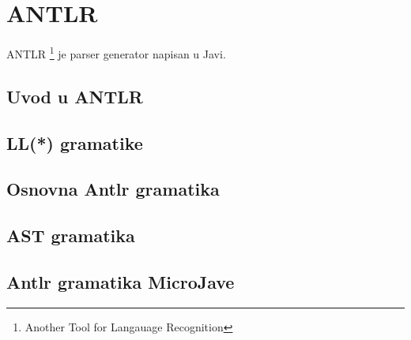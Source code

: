 \chapter{ANTLR}



ANTLR \footnote{Another Tool for Langauage Recognition} je parser generator napisan u Javi. 

\section{Uvod u ANTLR}

\section{LL(*) gramatike}


\section{Osnovna Antlr gramatika}

\section{AST gramatika}

\section{Antlr gramatika MicroJave}
